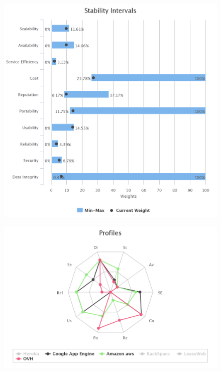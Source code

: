 \documentclass[a4paper,11pt]{article}
\begin{document}
\begin{figure}[h]
  \includegraphics[width=\textwidth]{img/Result/stability_chart.png}
\end{figure}

\begin{figure}[h]
  \includegraphics[width=\textwidth]{img/Result/spider_web-3best.png}
\end{figure}
\end{document}
